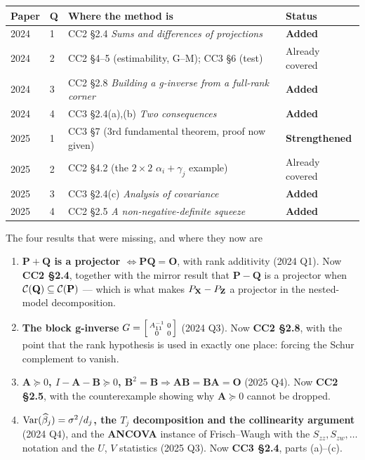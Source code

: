 \documentclass[11pt]{article}
\newcommand{\wh}[1]{\widehat{#1}}
\newcommand{\Pj}{\mathbf{P}}
\begin{document}
\begin{center}
\begin{tabular}{@{}llp{6.4cm}l@{}}
\toprule
Paper & Q & Where the method is & Status \\
\midrule
2024 & 1 & CC2 \S2.4 \emph{Sums and differences of projections} & \textbf{Added} \\
2024 & 2 & CC2 \S4--5 (estimability, G--M); CC3 \S6 (test) & Already covered \\
2024 & 3 & CC2 \S2.8 \emph{Building a g-inverse from a full-rank corner} & \textbf{Added} \\
2024 & 4 & CC3 \S2.4(a),(b) \emph{Two consequences} & \textbf{Added} \\
2025 & 1 & CC3 \S7 (3rd fundamental theorem, proof now given) & \textbf{Strengthened} \\
2025 & 2 & CC2 \S4.2 (the $2\times2$ $\alpha_i+\gamma_j$ example) & Already covered \\
2025 & 3 & CC3 \S2.4(c) \emph{Analysis of covariance} & \textbf{Added} \\
2025 & 4 & CC2 \S2.5 \emph{A non-negative-definite squeeze} & \textbf{Added} \\
\bottomrule
\end{tabular}
\end{center}

\begin{recipe}{The four results that were missing, and where they now are}
\begin{enumerate}
  \item \textbf{$\Pj+\mathbf{Q}$ is a projector $\iff\Pj\mathbf{Q}=\mathbf{O}$}, with rank
        additivity (2024 Q1). Now \textbf{CC2 \S2.4}, together with the mirror result that
        $\Pj-\mathbf{Q}$ is a projector when $\Cs(\mathbf{Q})\subseteq\Cs(\Pj)$ --- which is
        what makes $P_{\mathbf{X}}-P_{\mathbf{Z}}$ a projector in the nested-model decomposition.
  \item \textbf{The block g-inverse} $G=\begin{bsmallmatrix}A_{11}^{-1}&0\\0&0\end{bsmallmatrix}$
        (2024 Q3). Now \textbf{CC2 \S2.8}, with the point that the rank hypothesis is used in
        exactly one place: forcing the Schur complement to vanish.
  \item \textbf{$\mathbf{A}\succeq0$, $I-\mathbf{A}-\mathbf{B}\succeq0$,
        $\mathbf{B}^2=\mathbf{B}\Rightarrow\mathbf{AB}=\mathbf{BA}=\mathbf{O}$} (2025 Q4).
        Now \textbf{CC2 \S2.5}, with the counterexample showing why $\mathbf{A}\succeq0$
        cannot be dropped.
  \item \textbf{$\Var(\wh\beta_j)=\sigma^2/d_j$, the $T_j$ decomposition and the collinearity
        argument} (2024 Q4), and the \textbf{ANCOVA} instance of Frisch--Waugh with the
        $S_{zz},S_{zw},\dots$ notation and the $U$, $V$ statistics (2025 Q3). Now
        \textbf{CC3 \S2.4}, parts (a)--(c).
\end{enumerate}
\end{recipe}
\end{document}
